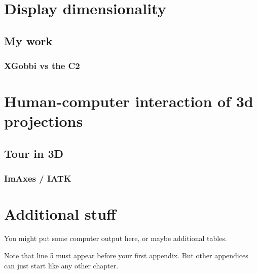 \documentclass{monashthesis}
\begin{document}
\chapter{Display dimensionality}\label{ch:disp_dim}

\section{My work}\label{my-work}

\subsection{XGobbi vs the C2}\label{xgobbi-vs-the-c2}

\chapter{Human-computer interaction of 3d
projections}\label{ch:hci_3dproj}

\section{Tour in 3D}\label{tour-in-3d}

\subsection{ImAxes / IATK}\label{imaxes-iatk}

\appendix

\chapter{Additional stuff}\label{additional-stuff}

You might put some computer output here, or maybe additional tables.

Note that line 5 must appear before your first appendix. But other
appendices can just start like any other chapter.

\printbibliography[heading=bibintoc]
\end{document}
